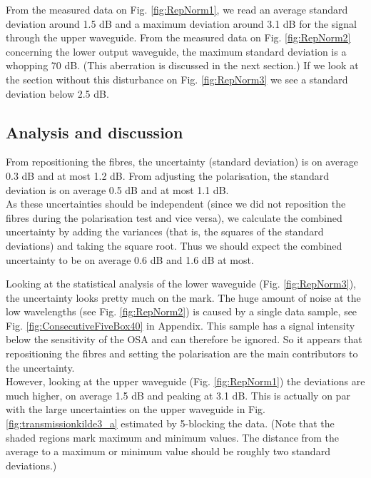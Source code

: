From the measured data on Fig. \ref{fig:RepNorm1}, we read an average standard deviation around 1.5 dB and a maximum deviation around 3.1 dB for the signal through the upper waveguide. From the measured data on Fig. \ref{fig:RepNorm2} concerning the lower output waveguide, the maximum standard deviation is a whopping 70 dB. (This aberration is discussed in the next section.) If we look at the section without this disturbance on Fig. \ref{fig:RepNorm3} we see a standard deviation below 2.5 dB. 

\subsection{Analysis and discussion} 

From repositioning the fibres, the uncertainty (standard deviation) is on average 0.3 dB and at most 1.2 dB. From adjusting the polarisation, the standard deviation is on average 0.5 dB and at most 1.1 dB. \\
As these uncertainties should be independent (since we did not reposition the fibres during the polarisation test and vice versa), we calculate the combined uncertainty by adding the variances (that is, the squares of the standard deviations) and taking the square root. Thus we should expect the combined uncertainty to be on average 0.6 dB and 1.6 dB at most.\\ \vspace{1cm}

Looking at the statistical analysis of the lower waveguide  (Fig. \ref{fig:RepNorm3}), the uncertainty looks pretty much on the mark. The huge amount of noise at the low wavelengths (see Fig. \ref{fig:RepNorm2}) is caused by a single data sample, see Fig. \ref{fig:ConsecutiveFiveBox40} in Appendix. This sample has a signal intensity below the sensitivity of the OSA and can therefore be ignored. So it appears that repositioning the fibres and setting the polarisation are the main contributors to the uncertainty. 
\\
However, looking at the upper waveguide (Fig. \ref{fig:RepNorm1}) the deviations are much higher, on average 1.5 dB and peaking at 3.1 dB. This is actually on par with the large uncertainties on the upper waveguide in Fig. \ref{fig:transmissionkilde3_a} estimated by 5-blocking the data. (Note that the shaded regions mark maximum and minimum values. The distance from the average to a maximum or minimum value should be roughly two standard deviations.)\\

